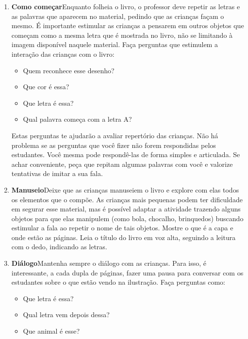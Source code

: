 \documentclass[11pt]{extarticle}
\begin{document}
\begin{enumerate}
\item \textbf{Como começar}\quad Enquanto folheia o livro, o professor deve repetir as letras e as palavras que aparecem no material, pedindo que as crianças façam o mesmo. É importante estimular as crianças a pensarem em outros objetos que começam como a mesma letra que é mostrada no livro, não se limitando à imagem disponível naquele material.
Faça perguntas que estimulem a interação das crianças com o livro:

\begin{itemize}
\item Quem reconhece esse desenho?
\item Que cor é essa?
\item Que letra é essa?
\item Qual palavra começa com a letra A?
\end{itemize}

Estas perguntas te ajudarão a avaliar repertório das crianças. 
Não há problema se as perguntas que você fizer não forem respondidas pelos 
estudantes. Você mesma pode respondê-las de forma simples e articulada. Se achar 
conveniente, peça que repitam algumas palavras com você e valorize tentativas 
de imitar a sua fala. 

 
\item \textbf{Manuseio}\quad Deixe que as crianças manuseiem o livro 
e explore com elas todos os elementos que o compõe.
As crianças mais pequenas podem ter dificuldade em segurar esse material, mas é possível adaptar a atividade trazendo alguns objetos para que elas manipulem (como bola, chocalho, brinquedos) buscando estimular a fala ao repetir o nome de tais objetos. 
Mostre o que é a 
capa e onde estão as páginas. Leia o título do livro em voz alta, seguindo 
a leitura com o dedo, indicando as letras. 

\item \textbf{Diálogo}\quad Mantenha sempre o diálogo com as crianças. Para isso, é interessante, a cada dupla de páginas, fazer uma 
pausa para conversar com os estudantes sobre o que estão vendo na ilustração. 
Faça perguntas como: 

\begin{itemize}
\item Que letra é essa?
\item Qual letra vem depois dessa?
\item Que animal é esse?
\end{itemize}


\end{enumerate}
\end{document}

